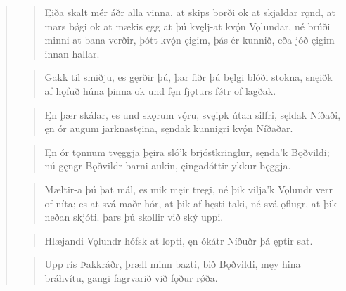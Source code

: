 \begin{verse}
\begin{verse}
\bva Ęiða skalt mér áðr \hld alla vinna,
at skips borði \hld ok at skjaldar rǫnd,
at mars bǿgi \hld ok at mækis ęgg
at þú kvęlj-at \hld kvǫ́n Vǫlundar,
né brúði minni \hld at bana verðir,
þótt kvǫ́n ęigim, \hld þás ér kunnið,
eða jóð ęigim \hld innan hallar. \\%
\end{verse}


\begin{verse}
\bva Gakk til smiðju, \hld es gęrðir þú,
þar fiðr þú bęlgi \hld blóði stokna,
snęiðk af hǫfuð \hld húna þinna
ok und fęn fjǫturs \hld fǿtr of lagðak. \\%
\end{verse}


\begin{verse}
\bva Ęn þær skálar, \hld es und skǫrum vǫ́ru,
svęipk útan silfri, \hld sęldak Níðaði,
ęn ór augum \hld jarknastęina,
sęndak kunnigri \hld kvǫ́n Níðaðar. \\%
\end{verse}


\begin{verse}
\bva Ęn ór tǫnnum \hld tvęggja þęira
sló'k brjóstkringlur, \hld sęnda'k Bǫðvildi;
nú gęngr Bǫðvildr \hld barni aukin,
ęingadóttir \hld ykkur bęggja. \\%
\end{verse}


\begin{verse}
\bva Mæltir-a þú þat mál, \hld es mik męir tregi,
né þik vilja'k Vǫlundr \hld verr of níta;
es-at svá maðr hór, \hld at þik af hęsti taki,
né svá ǫflugr, \hld at þik neðan skjóti.
þars þú skollir \hld við ský uppi. \\%
\end{verse}


\begin{verse}
\bva Hlæjandi Vǫlundr \hld hófsk at lopti,
ęn ókátr Níðuðr \hld þá ęptir sat. \\%
\end{verse}


\begin{verse}
\bva Upp rís Þakkráðr, \hld þræll minn bazti,
bið Bǫðvildi, \hld męy hina bráhvítu,
gangi fagrvarið \hld við fǫður rǿða. \\%
\end{verse}


\end{verse}
